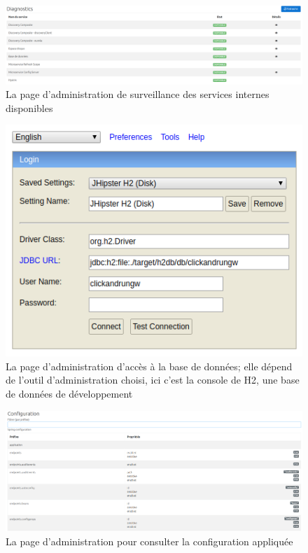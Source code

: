 \begin{figure}[ht]
    \centering
    \includegraphics[width=1\textwidth]{images/screenshot/admin-diagnostics.png}
    \caption{La page d'administration de surveillance des services internes disponibles}
\end{figure}

\begin{figure}[ht]
    \centering
    \includegraphics[width=1\textwidth]{images/screenshot/admin-db.png}
    \caption{La page d'administration d'accès à la base de données; elle dépend de l'outil d'administration choisi, ici c'est la console de H2, une base de données de développement}
\end{figure}

\begin{figure}[ht]
    \centering
    \includegraphics[width=1\textwidth]{images/screenshot/admin-config.png}
    \caption{La page d'administration pour consulter la configuration appliquée}
\end{figure}

